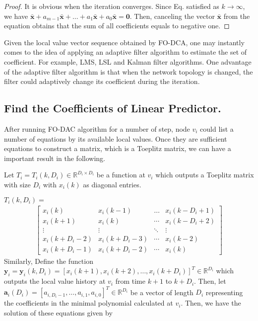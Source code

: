 \begin{proof}
It is obvious when the iteration converges. Since Eq. 
satisfied as $k\to\infty$, we have $\bar{\mathbf{x}}+a_{m-1}\bar{\mathbf{x}}+\ldots+a_{1}\bar{\mathbf{x}}+a_{0}\bar{\mathbf{x}}=\mathbf{0}$.
Then, canceling the vector $\bar{\mathbf{x}}$ from the equation obtains
that the sum of all coefficients equals to negative one. 
\end{proof}
Given the local value vector sequence obtained by FO-DCA, one may
instantly comes to the idea of applying an adaptive filter algorithm
to estimate the set of coefficient. For example, LMS, LSL and Kalman
filter algorithms. One advantage of the adaptive filter algorithm
is that when the network topology is changed, the filter could adaptively
change its coefficient during the iteration. 


\subsection*{Find the Coefficients of Linear Predictor.}

After running FO-DAC algorithm for a number of step, node $v_{i}$
could list a number of equations by its available local values. Once
they are sufficient equations to construct a matrix, which is a Toeplitz
matrix, we can have a important result in the following.

Let  $T_{i}=T_{i}\left(k,D_{i}\right)\in\mathbb{R}^{D_{i}\times D_{i}}$
be a function at $v_{i}$ which outputs a Toeplitz matrix with size
$D_{i}$ with $x_{i}\left(k\right)$ as diagonal entries.

$T_{i}\left(k,D_{i}\right)=$ 
\begin{align}
\left[\begin{array}{cccc}
x_{i}\left(k\right) & x_{i}\left(k-1\right) & \ldots & x_{i}\left(k-D_{i}+1\right)\\
x_{i}\left(k+1\right) & x_{i}\left(k\right) & \cdots & x_{i}\left(k-D_{i}+2\right)\\
\vdots & \vdots & \ddots & \vdots\\
x_{i}\left(k+D_{i}-2\right) & x_{i}\left(k+D_{i}-3\right) & \cdots & x_{i}\left(k-2\right)\\
x_{i}\left(k+D_{i}-1\right) & x_{i}\left(k+D_{i}-2\right) & \cdots & x_{i}\left(k\right)
\end{array}\right]\label{eq:Toeplitz_i simple-1}
\end{align}
Similarly, Define the function $\mathbf{y}_{i}=\mathbf{y}_{i}\left(k,D_{i}\right)=\left[x_{i}\left(k+1\right),x_{i}\left(k+2\right),\ldots,x_{i}\left(k+D_{i}\right)\right]^{T}\in\mathbb{R}^{D_{i}}$
which outputs the local value history at $v_{i}$ from time $k+1$
to $k+D_{i}$.  Then, let $\mathbf{a}_{i}\left(D_{i}\right)=\left[a_{i,D_{i}-1},\ldots,a_{i,1},a_{i,0}\right]^{T}\in\mathbb{R}^{D_{i}}$
be a vector of length $D_{i}$ representing the coefficients in the
minimal polynomial calculated at $v_{i}$. Then, we have the solution
of these equations given by

